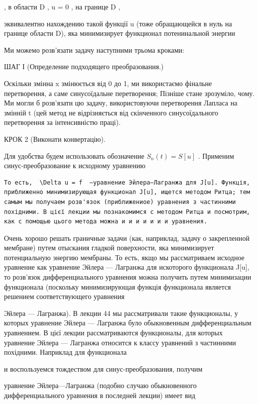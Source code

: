 \documentclass[
  ukrainian,
]{article}
\begin{document}
, в области D , u = 0 , на границе D ,

эквивалентно нахождению такой функції u (тоже обращающейся в нуль на
границе области D), яка минимизирует функционал потенинальной энергии

Ми можемо розв'язати задачу наступними трьома кроками:

ШАГ І (Определение подходящего преобразования.)

Оскільки змінна x змінюється від 0 до 1, ми використаємо фінальне
перетворення, а саме синусоїдальне перетворення; Пізніше стане
зрозуміло, чому. Ми могли б розв'язати цю задачу, використовуючи
перетворення Лапласа на змінній t (цей метод не відрізняється від
скінченного синусоїдального перетворення за інтенсивністю праці).

КРОК 2 (Виконати конвертацію).

Для удобства будем использовать обозначение \(S_n(t) = S[u]\) . Применим
синус-преобразование к исходному уравнению

\begin{verbatim}
То есть,  \Delta u = f  —уравнение Эйлера—Лагранжа для J[u]. Функція, приближенно минимизирующая функционал J[u], ищется методом Ритца; тем самым мы получаем розв'язок (приближениое) уравнения з частинними похідними. В цієї лекции мы познакомимся с методом Ритца и посмотрим, как с помощью цього метода можна и и и и и и и уравнения.
\end{verbatim}

Очень хорошо решать граничные задачи (как, наприклад, задачу о
закрепленной мембране) путем отыскания гладкой поверхности, яка
минимизирует потенциальную энергию мембраны. То есть, якщо мы
рассматриваем исходное уравнение как уравнение Эйлера --- Лагранжа для
искоторого функционала J{[}u{]}, то розв'язок дифференциального
уравнения можна получить путем минимизации функционала (поскольку
минимизирующая функція функционала является решением соответствующего
уравнения

Эйлера --- Лагранжа). В лекции 44 мы рассматривали такие функционалы, у
которых уравнение Эйлера --- Лагранжа було обыкновенным дифференциальным
уравнением. В цієї лекции рассматриваются функционалы, для которых
уравнение Эйлера --- Лагранжа относится к классу уравнений з частинними
похідними. Наприклад для функционала

и воспользуемся тождеством для синус-преобразования, получим

уравнение Эйлера---Лагранжа (подобно случаю обыкновенного
дифференциального уравнения в последней лекции) имеет вид
\end{document}
